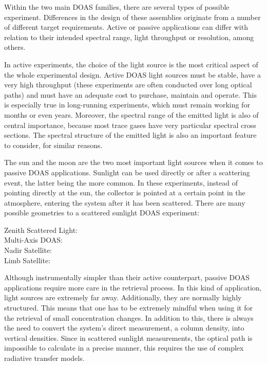 Within the two main \gls{DOAS} families, there are several types of
possible experiment. Differences in the design of these assemblies
originate from a number of different target requirements. Active or
passive applications can differ with relation to their intended spectral
range, light throughput or resolution, among others.

In active experiments, the choice of the light source is the most
critical aspect of the whole experimental design. Active \gls{DOAS}
light sources must be stable, have a very high throughput (these
experiments are often conducted over long optical paths) and must have
an adequate cost to purchase, maintain and operate. This is especially
true in long-running experiments, which must remain working for months
or even years. Moreover, the spectral range of the emitted light is also
of central importance, because most trace gases have very particular
spectral cross sections. The spectral structure of the emitted light is
also an important feature to consider, for similar reasons.

The sun and the moon are the two most important light sources when it
comes to passive \gls{DOAS} applications. Sunlight can be used directly
or after a scattering event, the latter being the more common. In these
experiments, instead of pointing directly at the sun, the collector is
pointed at a certain point in the atmosphere, entering the system after
it has been scattered. There are many possible geometries to a scattered
sunlight \gls{DOAS} experiment:
\begin{description}
    \item[Zenith Scattered Light:] 
    \item[Multi-Axis \gls{DOAS}:]
    \item[Nadir Satellite:]
    \item[Limb Satellite:]
\end{description}

Although instrumentally simpler than their active counterpart, passive
\gls{DOAS} applications require more care in the retrieval process. In
this kind of application, light sources are extremely far away.
Additionally, they are normally highly structured. This means that one
has to be extremely mindful when using it for the retrieval of small
concentration changes. In addition to this, there is always the need to
convert the system's direct measurement, a column density, into vertical
densities. Since in scattered sunlight measurements, the optical path is
impossible to calculate in a precise manner, this requires the use of
complex radiative transfer models.


